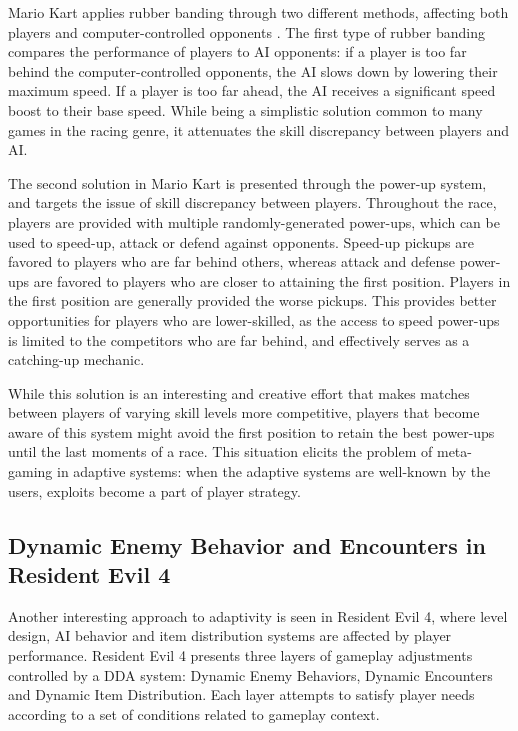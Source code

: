Mario Kart applies rubber banding through two different methods, affecting both players and computer-controlled opponents \cite{website_rubberbandingmariokart}. The first type of rubber banding compares the performance of players to AI opponents: if a player is too far behind the computer-controlled opponents, the AI slows down by lowering their maximum speed. If a player is too far ahead, the AI receives a significant speed boost to their base speed. While being a simplistic solution common to many games in the racing genre, it attenuates the skill discrepancy between players and AI. 

The second solution in Mario Kart is presented through the power-up system, and targets the issue of skill discrepancy between players. Throughout the race, players are provided with multiple randomly-generated power-ups, which can be used to speed-up, attack or defend against opponents. Speed-up pickups are favored to players who are far behind others, whereas attack and defense power-ups are favored to players who are closer to attaining the first position. Players in the first position are generally provided the worse pickups. This provides better opportunities for players who are lower-skilled, as the access to speed power-ups is limited to the competitors who are far behind, and effectively serves as a catching-up mechanic.

While this solution is an interesting and creative effort that makes matches between players of varying skill levels more competitive, players that become aware of this system might avoid the first position to retain the best power-ups until the last moments of a race. This situation elicits the problem of meta-gaming in adaptive systems: when the adaptive systems are well-known by the users, exploits become a part of player strategy.

\subsection{Dynamic Enemy Behavior and Encounters in Resident Evil 4}

Another interesting approach to adaptivity is seen in Resident Evil 4, where level design, AI behavior and item distribution systems are affected by player performance. Resident Evil 4 presents three layers of gameplay adjustments controlled by a DDA system: Dynamic Enemy Behaviors, Dynamic Encounters and Dynamic Item Distribution. Each layer attempts to satisfy player needs according to a set of conditions related to gameplay context.


